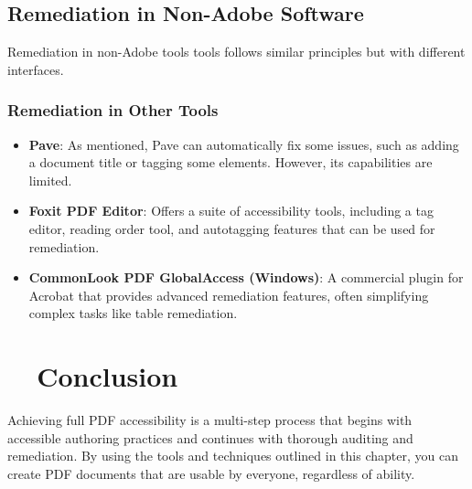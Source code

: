 \subsection{Remediation in Non-Adobe Software}
\label{subsec:remediation-non-adobe}
Remediation in non-Adobe tools tools follows similar principles but with different interfaces.

\subsubsection{Remediation in Other Tools}
\label{ssubsec:remediation-other-tools}
\begin{itemize}
	\item \textbf{Pave}: As mentioned, Pave can automatically fix some issues, such as adding a document title or tagging some elements. However, its capabilities are limited.
	\item \textbf{Foxit PDF Editor}: Offers a suite of accessibility tools, including a tag editor, reading order tool, and autotagging features that can be used for remediation.
	\item \textbf{CommonLook PDF GlobalAccess (Windows)\supercite{AllyantCommonLook}}: A commercial plugin for Acrobat that provides advanced remediation features, often simplifying complex tasks like table remediation.
\end{itemize}

\section{~~Conclusion}
\label{sec:pdf-report-conclusion}
Achieving full PDF accessibility is a multi-step process that begins with accessible authoring practices and continues with thorough auditing and remediation. By using the tools and techniques outlined in this chapter, you can create PDF documents that are usable by everyone, regardless of ability.
